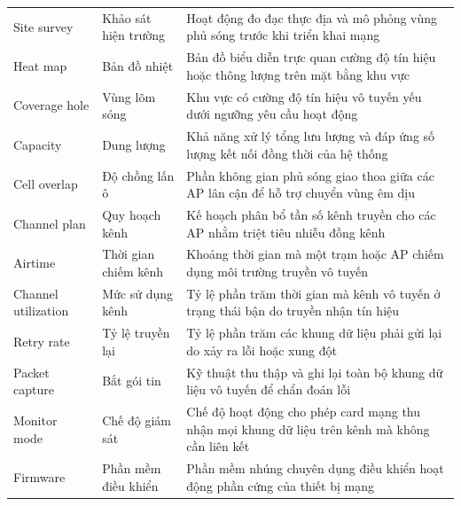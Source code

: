 \begin{xltabular}{\linewidth}{@{} L{0.8} L{0.8} L{1.4} @{}}
  Site survey & Khảo sát hiện trường & Hoạt động đo đạc thực địa và mô phỏng vùng phủ sóng trước khi triển khai mạng\\
  Heat map & Bản đồ nhiệt & Bản đồ biểu diễn trực quan cường độ tín hiệu hoặc thông lượng trên mặt bằng khu vực\\
  Coverage hole & Vùng lõm sóng & Khu vực có cường độ tín hiệu vô tuyến yếu dưới ngưỡng yêu cầu hoạt động\\
  Capacity & Dung lượng & Khả năng xử lý tổng lưu lượng và đáp ứng số lượng kết nối đồng thời của hệ thống\\
  Cell overlap & Độ chồng lấn ô & Phần không gian phủ sóng giao thoa giữa các AP lân cận để hỗ trợ chuyển vùng êm dịu\\
  Channel plan & Quy hoạch kênh & Kế hoạch phân bổ tần số kênh truyền cho các AP nhằm triệt tiêu nhiễu đồng kênh\\
  Airtime & Thời gian chiếm kênh & Khoảng thời gian mà một trạm hoặc AP chiếm dụng môi trường truyền vô tuyến\\
  Channel utilization & Mức sử dụng kênh & Tỷ lệ phần trăm thời gian mà kênh vô tuyến ở trạng thái bận do truyền nhận tín hiệu\\
  Retry rate & Tỷ lệ truyền lại & Tỷ lệ phần trăm các khung dữ liệu phải gửi lại do xảy ra lỗi hoặc xung đột\\
  Packet capture & Bắt gói tin & Kỹ thuật thu thập và ghi lại toàn bộ khung dữ liệu vô tuyến để chẩn đoán lỗi\\
  Monitor mode & Chế độ giám sát & Chế độ hoạt động cho phép card mạng thu nhận mọi khung dữ liệu trên kênh mà không cần liên kết\\
  Firmware & Phần mềm điều khiển & Phần mềm nhúng chuyên dụng điều khiển hoạt động phần cứng của thiết bị mạng\\
\end{xltabular}
\endgroup
